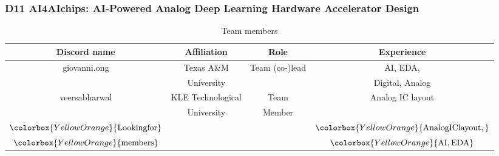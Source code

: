 \documentclass[xcolor={usenames,dvipsnames},hyperref={hyperindex,bookmarks}]{beamer}
\begin{document}
\begin{frame}
	\frametitle{D11 AI4AIchips: AI-Powered Analog Deep Learning Hardware Accelerator Design}

{\footnotesize
\begin{table}[htdp]
\caption{Team members}	%
\label{tab:TeamMembers}
	\begin{center}
		\begin{tabular}{|c|c|c|c|}
		\hline
		Discord name & Affiliation & Role & Experience \\
		\hline
		giovanni.ong & Texas A{\rm \&}M & Team (co-)lead & AI, EDA, \\
		 & University &  & Digital, Analog \\
		\hline
		veersabharwal & KLE Technological & Team & Analog IC layout \\
		 & University & Member &  \\
		\hline
		$\colorbox{YellowOrange}{\bf\rm Looking for}$ &  &  & $\colorbox{YellowOrange}{\bf\rm Analog IC layout,}$ \\
		$\colorbox{YellowOrange}{\bf\rm members}$ &  &  & $\colorbox{YellowOrange}{\bf\rm AI, EDA}$ \\
		\hline
		\end{tabular}
	\end{center}
\end{table}
}




\end{frame}




%
\end{document}
